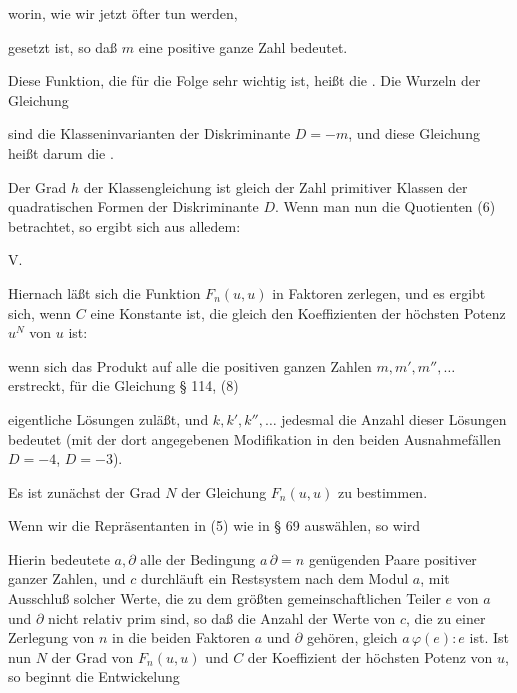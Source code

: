 worin, wie wir jetzt öfter tun werden,


gesetzt ist, so daß $m$ eine positive ganze Zahl bedeutet.

Diese Funktion, die für die Folge sehr wichtig ist, heißt die . Die Wurzeln der Gleichung


sind die Klasseninvarianten der Diskriminante $D = -m$, und diese Gleichung heißt darum die .

Der Grad $h$ der Klassengleichung ist gleich der Zahl primitiver Klassen der quadratischen Formen der Diskriminante $D$. Wenn man nun die Quotienten (6) betrachtet, so ergibt sich aus alledem:

V. 

Hiernach läßt sich die Funktion $F_n(u, u)$ in Faktoren zerlegen, und es ergibt sich, wenn $C$ eine Konstante ist, die gleich den Koeffizienten der höchsten Potenz $u^N$ von $u$ ist:


wenn sich das Produkt auf alle die positiven ganzen Zahlen $m, m', m'', \ldots$ erstreckt, für die Gleichung § 114, (8)


eigentliche Lösungen zuläßt, und $k, k', k'', \ldots$ jedesmal die Anzahl dieser Lösungen bedeutet (mit der dort angegebenen Modifikation in den beiden Ausnahmefällen $D = -4$, $D = -3$).

Es ist zunächst der Grad $N$ der Gleichung $F_n(u, u)$ zu bestimmen.

Wenn wir die Repräsentanten in (5) wie in § 69 auswählen, so wird


Hierin bedeutete $a, \partial$ alle der Bedingung $a\,\partial = n$ genügenden Paare positiver ganzer Zahlen, %
und $c$ durchläuft ein Restsystem nach dem Modul $a$, mit Ausschluß solcher Werte, die zu dem größten gemeinschaftlichen Teiler $e$ von $a$ und $\partial$ nicht relativ prim sind, so daß die Anzahl der Werte von $c$, die zu einer Zerlegung von $n$ in die beiden Faktoren $a$ und $\partial$ gehören, gleich $a\,\varphi(e){:}e$ ist. Ist nun $N$ der Grad von $F_n(u, u)$ und $C$ der Koeffizient der höchsten Potenz von $u$, so beginnt die Entwickelung
